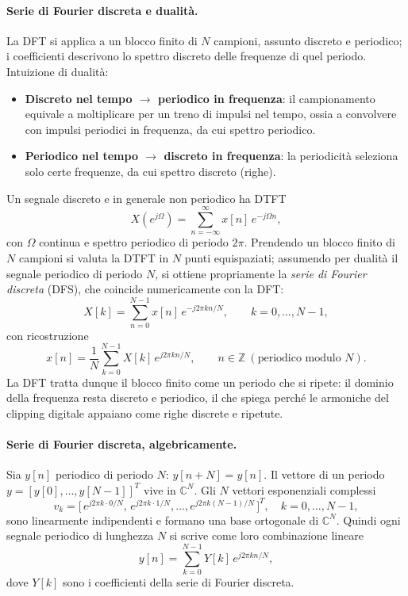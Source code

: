 \paragraph{Serie di Fourier discreta e dualità.}\label{sec:fourier_duality}
La DFT si applica a un blocco finito di $N$ campioni, assunto discreto e
periodico; i coefficienti descrivono lo spettro discreto delle frequenze
di quel periodo. Intuizione di dualità:
\begin{itemize}
  \item \textbf{Discreto nel tempo $\rightarrow$ periodico in frequenza}:
        il campionamento equivale a moltiplicare per un treno di impulsi
        nel tempo, ossia a convolvere con impulsi periodici in frequenza,
        da cui spettro periodico.
  \item \textbf{Periodico nel tempo $\rightarrow$ discreto in frequenza}:
        la periodicità seleziona solo certe frequenze, da cui spettro
        discreto (righe).
\end{itemize}
Un segnale discreto e in generale non periodico ha DTFT
\begin{equation}
  X(e^{j\Omega})=\sum_{n=-\infty}^{\infty}x[n]\,e^{-j\Omega n},
\end{equation}
con $\Omega$ continua e spettro periodico di periodo $2\pi$. Prendendo un
blocco finito di $N$ campioni si valuta la DTFT in $N$ punti
equispaziati; assumendo per dualità il segnale periodico di periodo $N$,
si ottiene propriamente la \emph{serie di Fourier discreta} (DFS), che
coincide numericamente con la DFT:
\begin{equation}
  X[k]=\sum_{n=0}^{N-1}x[n]\,e^{-j2\pi kn/N},\qquad k=0,\dots,N-1,
  \label{eq:dft}
\end{equation}
con ricostruzione
\begin{equation}
  x[n]=\frac{1}{N}\sum_{k=0}^{N-1}X[k]\,e^{j2\pi kn/N},
  \qquad n\in\mathbb{Z}\ (\text{periodico modulo }N).
\end{equation}
La DFT tratta dunque il blocco finito come un periodo che si ripete: il
dominio della frequenza resta discreto e periodico, il che spiega perché
le armoniche del clipping digitale appaiano come righe discrete e
ripetute.

\paragraph{Serie di Fourier discreta, algebricamente.}
Sia $y[n]$ periodico di periodo $N$: $y[n+N]=y[n]$. Il vettore di un
periodo $y=[y[0],\dots,y[N-1]]^T$ vive in $\mathbb{C}^N$. Gli $N$ vettori
esponenziali complessi
\begin{equation}
  v_k=\big[\,e^{j2\pi k\cdot0/N},\,e^{j2\pi k\cdot1/N},\dots,
            e^{j2\pi k(N-1)/N}\,\big]^T,\quad k=0,\dots,N-1,
\end{equation}
sono linearmente indipendenti e formano una base ortogonale di
$\mathbb{C}^N$. Quindi ogni segnale periodico di lunghezza $N$ si scrive
come loro combinazione lineare
\begin{equation}
  y[n]=\sum_{k=0}^{N-1}Y[k]\,e^{j2\pi kn/N},
\end{equation}
dove $Y[k]$ sono i coefficienti della serie di Fourier discreta.

